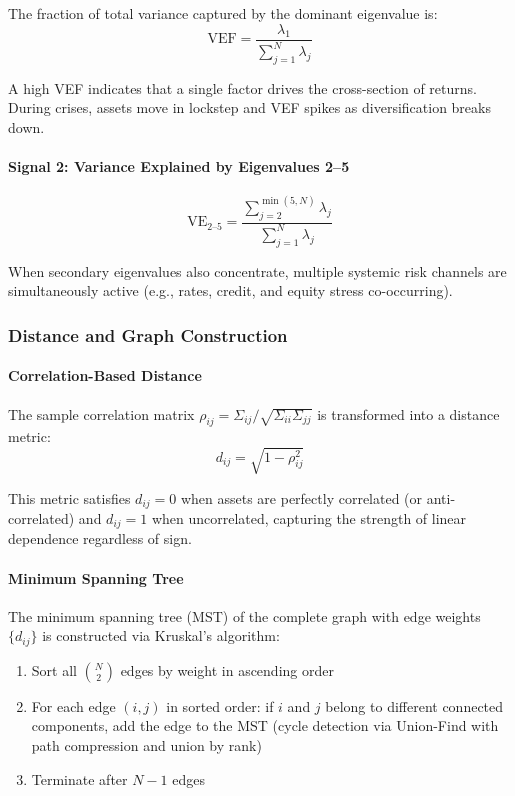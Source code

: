 The fraction of total variance captured by the dominant eigenvalue is:
\[
\text{VEF} = \frac{\lambda_1}{\sum_{j=1}^{N} \lambda_j}
\]

A high VEF indicates that a single factor drives the cross-section of returns. During crises, assets move in lockstep and VEF spikes as diversification breaks down.

\paragraph{Signal 2: Variance Explained by Eigenvalues 2--5}

\[
\text{VE}_{2\text{--}5} = \frac{\sum_{j=2}^{\min(5,N)} \lambda_j}{\sum_{j=1}^{N} \lambda_j}
\]

When secondary eigenvalues also concentrate, multiple systemic risk channels are simultaneously active (e.g., rates, credit, and equity stress co-occurring).

\subsubsection{Distance and Graph Construction}

\paragraph{Correlation-Based Distance}

The sample correlation matrix $\rho_{ij} = \Sigma_{ij} / \sqrt{\Sigma_{ii} \Sigma_{jj}}$ is transformed into a distance metric:
\[
d_{ij} = \sqrt{1 - \rho_{ij}^2}
\]

This metric satisfies $d_{ij} = 0$ when assets are perfectly correlated (or anti-correlated) and $d_{ij} = 1$ when uncorrelated, capturing the strength of linear dependence regardless of sign.

\paragraph{Minimum Spanning Tree}

The minimum spanning tree (MST) of the complete graph with edge weights $\{d_{ij}\}$ is constructed via Kruskal's algorithm:

\begin{enumerate}
  \item Sort all $\binom{N}{2}$ edges by weight in ascending order
  \item For each edge $(i, j)$ in sorted order: if $i$ and $j$ belong to different connected components, add the edge to the MST (cycle detection via Union-Find with path compression and union by rank)
  \item Terminate after $N - 1$ edges
\end{enumerate}

